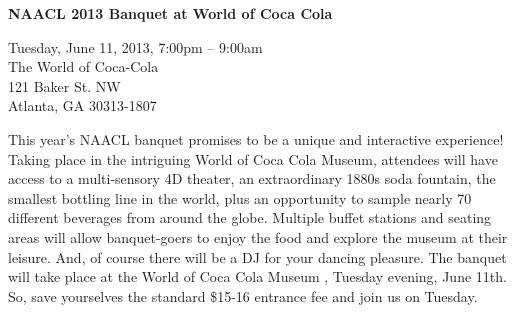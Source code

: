 \begin{center}

\begin{Large}
{\bfseries\Large NAACL 2013 Banquet at World of Coca Cola}\vspace{1em}\par
\end{Large}

Tuesday, June 11, 2013, 7:00pm -- 9:00am \vspace{1em}\\
The World of Coca-Cola\\
121 Baker St. NW\\
Atlanta, GA 30313-1807\\
\end{center}

\noindent
This year's NAACL banquet promises to be a unique and interactive experience! Taking place in the intriguing World of Coca Cola Museum, attendees will have access to a multi-sensory 4D theater, an extraordinary 1880s soda fountain, the smallest bottling line in the world, plus an opportunity to sample nearly 70 different beverages from around the globe. Multiple buffet stations and seating areas will allow banquet-goers to enjoy the food and explore the museum at their leisure. And, of course there will be a DJ for your dancing pleasure. The banquet will take place at the World of Coca Cola Museum , Tuesday evening, June 11th. So, save yourselves the standard \$15-16 entrance fee and join us on Tuesday.


\newpage
